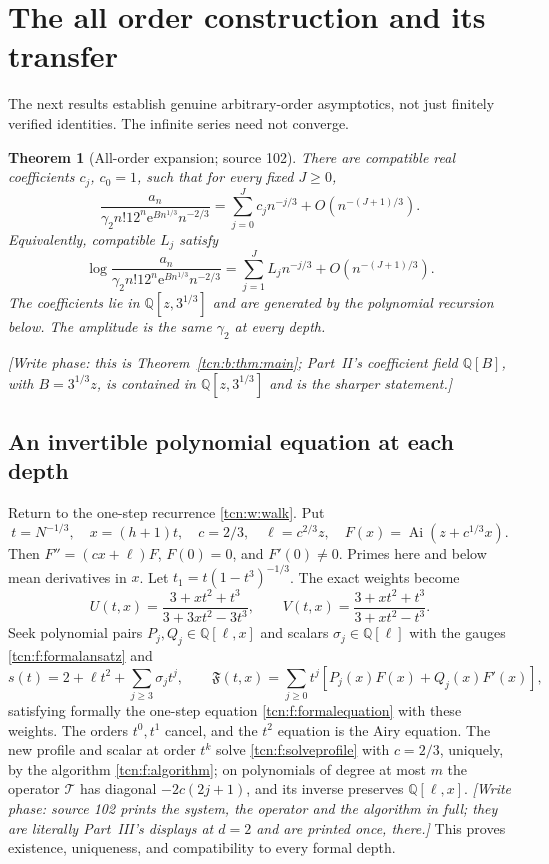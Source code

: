 \documentclass[11pt,letterpaper]{article}
\newcommand{\Ai}{\operatorname{Ai}}
\newcommand{\ee}{\mathrm e}
\newcommand{\Q}{\mathbb Q}
\newtheorem{theorem}{Theorem}[section]
\theoremstyle{remark}
\begin{document}
\section{The all order construction and its transfer}\label{tcn:w:sec:formal}
The next results establish genuine arbitrary-order asymptotics, not just finitely verified identities. The infinite series need not converge.
\begin{theorem}[All-order expansion; source 102]\label{tcn:w:thm:allorders}
There are compatible real coefficients $c_j$, $c_0=1$, such that for every fixed $J\ge0$,
\begin{equation}\label{tcn:w:allorders}
 \frac{a_n}{\gamma_2 n!12^n\ee^{Bn^{1/3}}n^{-2/3}}
 =\sum_{j=0}^Jc_jn^{-j/3}+O(n^{-(J+1)/3}).
\end{equation}
Equivalently, compatible $L_j$ satisfy
\begin{equation}\label{tcn:w:logseries}
 \log\frac{a_n}{\gamma_2 n!12^n\ee^{Bn^{1/3}}n^{-2/3}}
 =\sum_{j=1}^JL_jn^{-j/3}+O(n^{-(J+1)/3}).
\end{equation}
The coefficients lie in $\Q[z,3^{1/3}]$ and are generated by the polynomial recursion below. The amplitude is the same $\gamma_2$ at every depth.
\end{theorem}
\emph{[Write phase: this is Theorem~\ref{tcn:b:thm:main}; Part~II's coefficient field $\Q[B]$, with $B=3^{1/3}z$, is contained in $\Q[z,3^{1/3}]$ and is the sharper statement.]}

\subsection{An invertible polynomial equation at each depth}
Return to the one-step recurrence \eqref{tcn:w:walk}. Put
\[
 t=N^{-1/3},\quad x=(h+1)t,\quad c=2/3,\quad
 \ell=c^{2/3}z,\quad F(x)=\Ai(z+c^{1/3}x).
\]
Then $F''=(cx+\ell)F$, $F(0)=0$, and $F'(0)\ne0$. Primes here and below mean derivatives in $x$. Let $t_1=t(1-t^3)^{-1/3}$. The exact weights become
\[
 U(t,x)=\frac{3+xt^2+t^3}{3+3xt^2-3t^3},\qquad
 V(t,x)=\frac{3+xt^2+t^3}{3+xt^2-t^3}.
\]
Seek polynomial pairs $P_j,Q_j\in\Q[\ell,x]$ and scalars $\sigma_j\in\Q[\ell]$ with the gauges \eqref{tcn:f:formalansatz} and
\[
 s(t)=2+\ell t^2+\sum_{j\ge3}\sigma_jt^j,\qquad
 \mathfrak F(t,x)=\sum_{j\ge0}t^j[P_j(x)F(x)+Q_j(x)F'(x)],
\]
satisfying formally the one-step equation \eqref{tcn:f:formalequation} with these weights. The orders $t^0,t^1$ cancel, and the $t^2$ equation is the Airy equation. The new profile and scalar at order $t^k$ solve \eqref{tcn:f:solveprofile} with $c=2/3$, uniquely, by the algorithm \eqref{tcn:f:algorithm}; on polynomials of degree at most $m$ the operator $\mathcal T$ has diagonal $-2c(2j+1)$, and its inverse preserves $\Q[\ell,x]$. \emph{[Write phase: source 102 prints the system, the operator and the algorithm in full; they are literally Part~III's displays at $d=2$ and are printed once, there.]} This proves existence, uniqueness, and compatibility to every formal depth.
\end{document}
